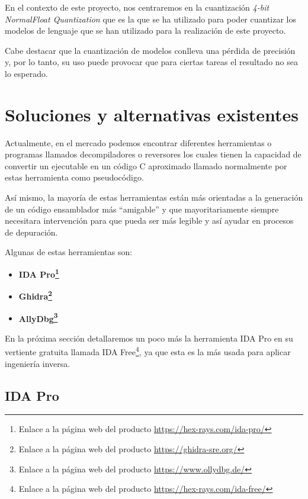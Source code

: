 En el contexto de este proyecto, nos centraremos en la cuantización \textit{4-bit
NormalFloat Quantization} que es la que se ha utilizado para poder cuantizar los
modelos de lenguaje que se han utilizado para la realización de este proyecto.

Cabe destacar que la cuantización de modelos conlleva una pérdida de precisión y, por
lo tanto, su uso puede provocar que para ciertas tareas el resultado no sea lo esperado.

\section{Soluciones y alternativas existentes}
\label{sec:alternativas}


Actualmente, en el mercado podemos encontrar diferentes herramientas o programas llamados
decompiladores o reversores los cuales tienen la capacidad de convertir un ejecutable
en un código C aproximado llamado normalmente por estas herramienta como pseudocódigo.

Así mismo, la mayoría de estas herramientas están más orientadas a la generación de un
código ensamblador más ``amigable'' y que mayoritariamente siempre necesitara intervención
para que pueda ser más legible y así ayudar en procesos de depuración.

Algunas de estas herramientas son:

\begin{itemize}
    \item \bf IDA Pro\footnote{Enlace a la página web del producto \url{https://hex-rays.com/ida-pro/}}
    \item \bf Ghidra\footnote{Enlace a la página web del producto \url{https://ghidra-sre.org/}}
    \item \bf AllyDbg\footnote{Enlace a la página web del producto \url{https://www.ollydbg.de/}}
\end{itemize}

En la próxima sección detallaremos un poco más la herramienta IDA Pro en su vertiente
gratuita llamada IDA Free\footnote{Enlace a la página web del producto \url{https://hex-rays.com/ida-free/}},
ya que esta es la más usada para aplicar ingeniería inversa.

\subsection{IDA Pro}
\label{subsec:IDA_pro}

